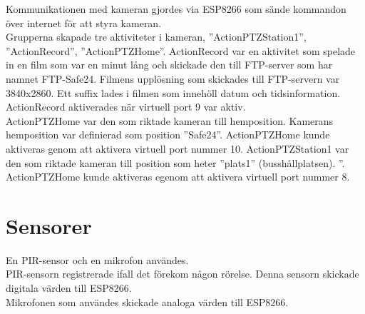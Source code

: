 Kommunikationen med kameran gjordes via ESP8266 som sände kommandon över internet för att styra kameran.\\

Grupperna skapade tre aktiviteter i kameran, ”ActionPTZStation1”, ”ActionRecord”, ”ActionPTZHome”.
ActionRecord var en aktivitet som spelade in en film som var en minut lång och skickade den till FTP-server som har namnet FTP-Safe24. Filmens upplösning som skickades till FTP-servern var 3840x2860. Ett suffix lades i filmen som innehöll datum och tidsinformation. ActionRecord aktiverades när virtuell port 9 var aktiv.\\
ActionPTZHome var den som riktade kameran till hemposition. Kamerans hemposition var definierad som position ”Safe24”. ActionPTZHome kunde aktiveras genom att aktivera virtuell port nummer 10.
ActionPTZStation1 var den som riktade kameran till position som heter ”plats1” (busshållplatsen). ”. ActionPTZHome kunde aktiveras egenom att aktivera virtuell port nummer 8.


\section{Sensorer}
En PIR-sensor och en mikrofon användes.\\

PIR-sensorn registrerade ifall det förekom någon rörelse. Denna sensorn skickade digitala värden till ESP8266.\\

Mikrofonen som användes skickade analoga värden till ESP8266.\\






 



